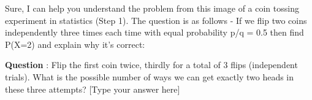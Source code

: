 Sure, I can help you understand the problem from this image of a coin tossing experiment in statistics (Step 1). The question is as follows - If we flip two coins independently three times each time with equal probability p/q = 0.5 then find P(X=2) and explain why it's correct:

\textbf{Question} : Flip the first coin twice, thirdly for a total of 3 flips (independent trials). What is the possible number of ways we can get exactly two heads in these three attempts? [Type your answer here]
